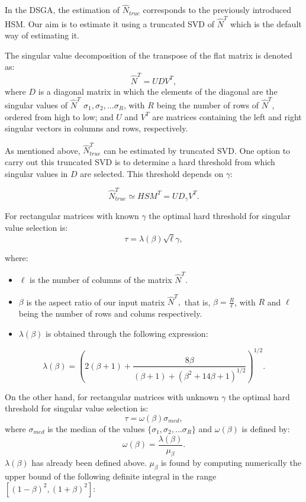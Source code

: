 In the DSGA, the estimation of \(\hat{N}_{true}\) corresponds to the previously introduced HSM. Our aim is to estimate it using a truncated SVD of \(\hat{N}^T\) which is the default way of estimating it.

The singular value decomposition of the transpose of the flat matrix is denoted as:
\[\hat{N}^T = U  D  V^T,\]
where \(D\) is a diagonal matrix in which the elements of the diagonal are the singular values of \(\hat{N}^T\) \(\sigma_{1}, \sigma_{2},... \sigma_{R}\), with \(R\) being the number of rows of \(\hat{N}^T\), ordered from high to low; and \(U\) and \(V^T\) are matrices containing the left and right singular vectors in columns and rows, respectively.

As mentioned above, \(\hat{N}_{true}^T\) can be estimated by truncated SVD. One option to carry out this truncated SVD is to determine a hard threshold from which singular values in \(D\) are selected. This threshold depends on \(\gamma\):

\[\hat{N}_{true}^T \simeq HSM^T = U D_{\gamma}V^T.\]

For rectangular matrices with known \(\gamma\) the optimal hard threshold for singular value selection is:
\[\tau = \lambda(\beta)\sqrt{\ell}\gamma,\]

where:

\begin{itemize}
\tightlist
\item
  \(\ell\) is the number of columns of the matrix \(\hat{N}^T\).
\item
  \(\beta\) is the aspect ratio of our input matrix \(\hat{N}^T,\) that is, \(\beta = \frac{R}{\ell}\), with \(R\) and \(\ell\) being the number of rows and colums respectively.
\item
  \(\lambda(\beta)\) is obtained through the following expression:
\end{itemize}

\[\lambda(\beta) = \left (2(\beta + 1) + \frac{8\beta}{(\beta + 1) + (\beta^2 + 14\beta + 1)^{1/2}} \right)^{1/2}.\]

On the other hand, for rectangular matrices with unknown \(\gamma\) the optimal hard threshold for singular value selection is:
\[\tau = \omega(\beta)\sigma_{med},\]
where \(\sigma_{med}\) is the median of the values \(\{\sigma_{1}, \sigma_{2},... \sigma_{R}\}\) and \(\omega(\beta)\) is defined by:
\[\omega(\beta) = \frac{\lambda(\beta)}{\mu_{\beta}}.\]
\(\lambda(\beta)\) has already been defined above. \(\mu_{\beta}\) is found by computing numerically the upper bound of the following definite integral in the range \([(1-\beta)^2,(1+\beta)^2]\):

